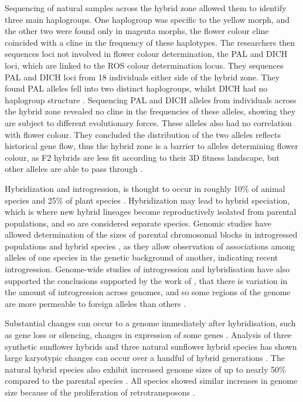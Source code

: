 Sequencing of natural samples across the hybrid zone allowed them to identify three main haplogroups.
One haplogroup was specific to the yellow morph, and the other two were found only in magenta morphs, the flower colour cline coincided with a cline in the frequency of these haplotypes.
The researchers then sequences loci not involved in flower colour determination, the PAL and DICH loci, which are linked to the ROS colour determination locus. 
They sequences PAL and DICH loci from 18 individuals either side of the hybrid zone.
They found PAL alleles fell into two distinct haplogroups, whilst DICH had no haplogroup structure \parencite{Whibley2006}.
Sequencing PAL and DICH alleles from individuals across the hybrid zone revealed no cline in the frequencies of these alleles, showing they are subject to different evolutionary forces.
These alleles also had no correlation with flower colour.
They concluded the distribution of the two alleles reflects historical gene flow, thus the hybrid zone is a barrier to alleles determining flower colour, as F2 hybrids are less fit according to their 3D fitness landscape, but other alleles are able to pass through \parencite{Whibley2006}.

Hybridization and introgression, is thought to occur in roughly 10\% of animal species and 25\% of plant species \parencite{Mallet2005a}.
Hybridization may lead to hybrid speciation, which is where new hybrid lineages become reproductively isolated from parental populations, and so are considered separate species.
Genomic studies have allowed  determination of the sizes of parental chromosomal blocks in introgressed populations and hybrid species \parencite{Buerkle2008,Morrell2005}, as they allow observation of associations among alleles of one species in the genetic background of another, indicating recent introgression.
Genome-wide studies of introgression and hybridisation have also supported the conclusions supported by the work of \cite{Whibley2006}, that there is variation in the amount of introgression across genomes, and so some regions of the genome are more permeable to foreign alleles than others \parencite{Martinsen2001,Macholan2007,Scotti-Saintagne2004,Turner2005,Yatabe2007}.

Substantial changes can occur to a genome immediately after hybridisation, such as gene loss or silencing, changes in expression of some genes \parencite{Adams2005}.
Analysis of three synthetic sunflower hybrids and three natural sunflower hybrid species has shown large karyotypic changes can occur over a handful of hybrid generations \parencite{Karrenberg2007,Lai2005}.
The natural hybrid species also exhibit increased genome sizes of up to nearly 50\% compared to the parental species \parencite{Baack2005}.
All species showed similar increases in genome size because of the proliferation of retrotransposons \parencite{Ungerer2006}.

